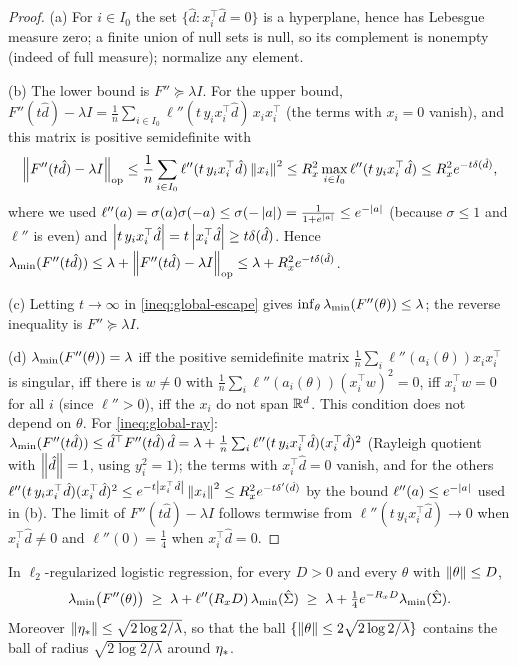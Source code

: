 \begin{proof}
(a) For $i\in I_0$ the set $\{\hat d:x_i^\top\hat d=0\}$ is a hyperplane, hence has Lebesgue measure zero; a finite
union of null sets is null, so its complement is nonempty (indeed of full measure); normalize any element.

(b) The lower bound is $F''\succcurlyeq\lambda I$. For the upper bound, $F''(t\hat d)-\lambda I=\frac1n\sum_{i\in I_0}
\ell''(t\,y_ix_i^\top\hat d)\,x_ix_i^\top$ (the terms with $x_i=0$ vanish), and this matrix is positive semidefinite with
\[
\left\|F''(t\hat d)-\lambda I\right\|_{\mathrm{op}}\le\frac1n\sum_{i\in I_0}\ell''(t\,y_ix_i^\top\hat d)\left\|x_i\right\|^2
\le R_x^2\max_{i\in I_0}\ell''(t\,y_ix_i^\top\hat d)\le R_x^2e^{-t\delta(\hat d)},
\]
where we used $\ell''(a)=\sigma(a)\sigma(-a)\le\sigma(-\left|a\right|)=\frac1{1+e^{\left|a\right|}}\le e^{-\left|a\right|}$ (because
$\sigma\le1$ and $\ell''$ is even) and $\left|t\,y_ix_i^\top\hat d\right|=t\left|x_i^\top\hat d\right|\ge t\delta(\hat d)$. Hence
$\lambda_{\min}(F''(t\hat d))\le\lambda+\left\|F''(t\hat d)-\lambda I\right\|_{\mathrm{op}}\le\lambda+R_x^2e^{-t\delta(\hat d)}$.

(c) Letting $t\to\infty$ in \eqref{ineq:global-escape} gives $\inf_\theta\lambda_{\min}(F''(\theta))\le\lambda$; the
reverse inequality is $F''\succcurlyeq\lambda I$.

(d) $\lambda_{\min}(F''(\theta))=\lambda$ iff the positive semidefinite matrix $\frac1n\sum_i\ell''(a_i(\theta))x_ix_i^\top$ is
singular, iff there is $w\neq0$ with $\frac1n\sum_i\ell''(a_i(\theta))(x_i^\top w)^2=0$, iff $x_i^\top w=0$ for all
$i$ (since $\ell''>0$), iff the $x_i$ do not span $\mathbb{R}^d$. This condition does not depend on $\theta$.
For \eqref{ineq:global-ray}: $\lambda_{\min}(F''(t\hat d))\le\hat d^\top F''(t\hat d)\,\hat d=\lambda+\frac1n\sum_i\ell''(t\,y_ix_i^\top\hat d)(x_i^\top\hat d)^2$
(Rayleigh quotient with $\left\|\hat d\right\|=1$, using $y_i^2=1$); the terms with $x_i^\top\hat d=0$ vanish, and for the others
$\ell''(t\,y_ix_i^\top\hat d)(x_i^\top\hat d)^2\le e^{-t\left|x_i^\top\hat d\right|}\left\|x_i\right\|^2\le R_x^2e^{-t\delta'(\hat d)}$ by the bound
$\ell''(a)\le e^{-\left|a\right|}$ used in (b). The limit of $F''(t\hat d)-\lambda I$ follows termwise from $\ell''(t\,y_ix_i^\top\hat d)\to0$
when $x_i^\top\hat d\neq0$ and $\ell''(0)=\frac14$ when $x_i^\top\hat d=0$.
\end{proof}

\begin{corollary}\label{cor:B2-ball}
In $\ell_2$-regularized logistic regression, for every $D>0$ and every $\theta$ with $\left\|\theta\right\|\le D$,
\begin{equation}\label{ineq:ball-lower}
\lambda_{\min}\big(F''(\theta)\big)\;\ge\;\lambda+\ell''(R_xD)\,\lambda_{\min}(\hat\Sigma)\;\ge\;\lambda+\tfrac14e^{-R_xD}\lambda_{\min}(\hat\Sigma).
\end{equation}
Moreover $\left\|\eta_\ast\right\|\le\sqrt{2\log2/\lambda}$, so that the ball $\{\left\|\theta\right\|\le2\sqrt{2\log2/\lambda}\}$
contains the ball of radius $\sqrt{2\log2/\lambda}$ around $\eta_\ast$.
\end{corollary}

